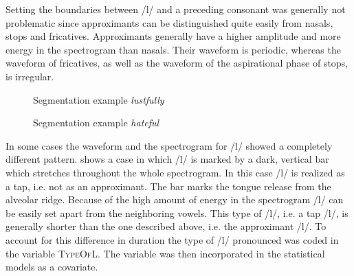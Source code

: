 Setting the boundaries between /l/ and a preceding consonant was generally not problematic since approximants can be distinguished quite easily from nasals, stops and fricatives. Approximants generally have a  higher amplitude and more energy in the spectrogram than nasals. Their waveform is periodic, whereas the waveform of fricatives, as well as the waveform of the aspirational phase of stops, is irregular.



\begin{figure}[p]
	\caption{Segmentation example \textit{lustfully}}
	\label{fig:segmentation lustfully}
\end{figure}

\begin{figure}[p]
	\caption{Segmentation example \textit{hateful}}
	\label{fig:segmentation hateful}
\end{figure}



In some cases the waveform and the spectrogram for /l/ showed a completely different pattern.  shows a case in which /l/ is marked by a dark, vertical bar which stretches throughout the whole spectrogram. In this case /l/ is realized as a tap, i.e. not as an approximant. The bar marks the tongue release from the alveolar ridge. Because of the high amount of energy in the spectrogram /l/ can be easily set apart  from the neighboring vowels. This type of /l/, i.e. a tap /l/, is generally shorter than the one described above, i.e. the approximant /l/. To account for this difference in duration the type of /l/ pronounced was coded in the variable \textsc{TypeOfL}. The variable was then incorporated in the statistical models as a covariate.

